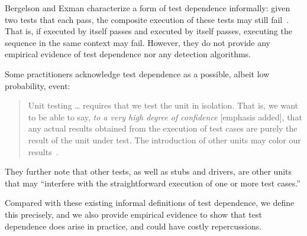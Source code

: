 


Bergelson and Exman characterize a form of test dependence informally:
given two tests that each pass, the composite
execution of these tests may still
fail~\cite[p.~38]{bergelsonetal:EEE:2006}.  That is, if 
 executed by itself passes and  executed by itself passes,
executing the sequence  in the same context may fail.
However, they do not provide any empirical evidence of
test dependence nor any detection algorithms.

Some practitioners acknowledge test dependence as a possible, albeit low probability, event:
\begin{quote}
Unit testing \dots  
requires that we test the unit in isolation. That is, we
want to be able to say, \emph{to a very high degree of confidence} [emphasis added], that
any actual results obtained from the execution of test cases are
purely the result of the unit under test. The introduction of
other units may color our results~\cite{unit-test-def}.
\end{quote}
They further note that other tests, as well as stubs and drivers, are
other units that may ``interfere with the straightforward
execution of one or more test cases.''


Compared with these existing informal definitions of test dependence,
we define this precisely, and we also provide empirical evidence
to show that test dependence does arise in practice, and could
have costly repercussions.

